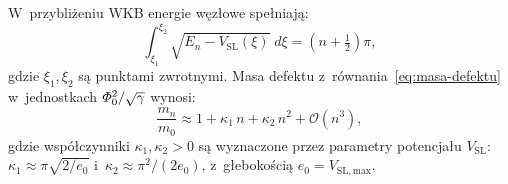 \begin{theorem}%
\label{thm:mass-spectrum}
W~przybli\.zeniu WKB energie w\k{e}z\l{}owe spe\l{}niaj\k{a}:
\begin{equation}\label{eq:WKB-quantization}
    \int_{\xi_1}^{\xi_2}
    \sqrt{E_n - V_{\mathrm{SL}}(\xi)}\;d\xi
    = \left(n + \tfrac{1}{2}\right)\pi,
\end{equation}
gdzie $\xi_1, \xi_2$ s\k{a} punktami zwrotnymi.
Masa defektu z~r\'ownania~\eqref{eq:masa-defektu} w~jednostkach
$\varPhi_0^2 / \sqrt{\gamma}$ wynosi:
\begin{equation}\label{eq:mass-nodal}
    \frac{m_n}{m_0}
    \approx
    1 + \kappa_1\,n + \kappa_2\,n^2 + \mathcal{O}(n^3),
\end{equation}
gdzie wspó\l{}czynniki $\kappa_1, \kappa_2 > 0$ s\k{a} wyznaczone
przez parametry potencja\l{}u $V_{\mathrm{SL}}$:
$\kappa_1 \approx \pi\sqrt{2/e_0}$ i~$\kappa_2 \approx \pi^2/(2 e_0)$,
z~g\l{}ebokością $e_0 = V_{\mathrm{SL,max}}$.
\end{theorem}

